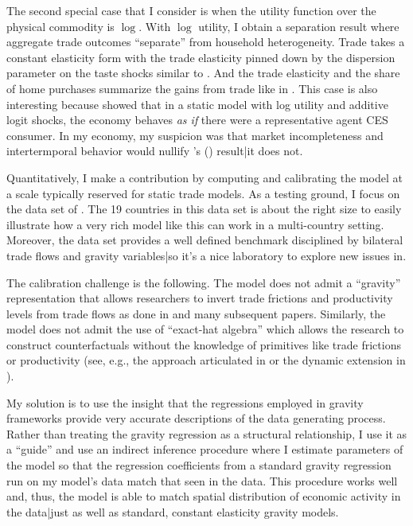 \documentclass[12pt,pdftex]{article}
\def\citeapos#1{\citeauthor{#1}'s (\citeyear{#1})}
\begin{document}
\begin{onehalfspacing}
The second special case that I consider is when the utility function over the physical commodity is $\log$. With $\log$ utility, I obtain a separation result where aggregate trade outcomes ``separate'' from household heterogeneity. Trade takes a constant elasticity form with the trade elasticity pinned down by the dispersion parameter on the taste shocks similar to \citet{eaton2002technology}. And the trade elasticity and the share of home purchases summarize the gains from trade like in \citet{arkolakis2012new}. This case is also interesting because \citet*{anderson1987ces} showed that in a static model with log utility and additive logit shocks, the economy behaves \emph{as if} there were a representative agent CES consumer. In my economy, my suspicion was that market incompleteness and intertermporal behavior would nullify \citeapos{anderson1987ces} result|it does not.

Quantitatively, I make a contribution by computing and calibrating the model at a scale typically reserved for static trade models. As a testing ground, I focus on the data set of \citet{eaton2002technology}. The 19 countries in this data set is about the right size to easily illustrate how a very rich model like this can work in a multi-country setting. Moreover, the \citet{eaton2002technology} data set provides a well defined benchmark disciplined by bilateral trade flows and gravity variables|so it's a nice laboratory to explore new issues in.

The calibration challenge is the following. The model does not admit a ``gravity'' representation that allows researchers to invert trade frictions and productivity levels from trade flows as done in \citet{eaton2002technology} and many subsequent papers. Similarly, the model does not admit the use of ``exact-hat algebra'' which allows the research to construct counterfactuals without the knowledge of primitives like trade frictions or productivity (see, e.g., the approach articulated in \citet{costinot2014trade} or the dynamic extension in \citet*{caliendo2015trade}).

My solution is to use the insight that the regressions employed in gravity frameworks provide very accurate descriptions of the data generating process. Rather than treating the gravity regression as a structural relationship, I use it as a ``guide'' and use an indirect inference procedure where I estimate parameters of the model so that the regression coefficients from a standard gravity regression run on my model's data match that seen in the data. This procedure works well and, thus, the model is able to match spatial distribution of economic activity in the data|just as well as standard, constant elasticity gravity models.


\end{onehalfspacing}
\end{document}
